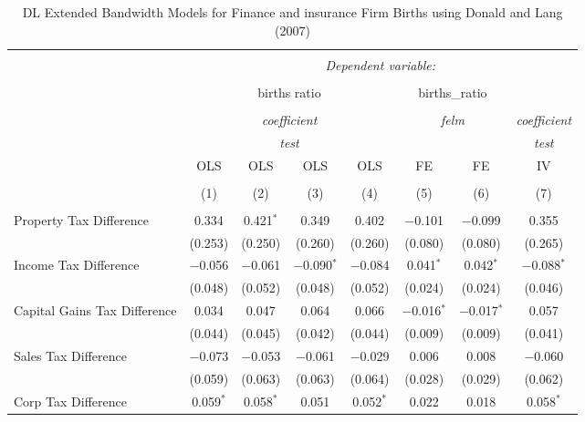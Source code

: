 
\begin{table}[!htbp] \centering 
  \caption{DL Extended Bandwidth Models for  Finance and insurance Firm Births using Donald and Lang (2007)} 
  \label{} 
\begin{tabular}{@{\extracolsep{5pt}}lccccccc} 
\\[-1.8ex]\hline 
\hline \\[-1.8ex] 
 & \multicolumn{7}{c}{\textit{Dependent variable:}} \\ 
\cline{2-8} 
\\[-1.8ex] & \multicolumn{4}{c}{births ratio} & \multicolumn{2}{c}{births\_ratio} &   \\ 
\\[-1.8ex] & \multicolumn{4}{c}{\textit{coefficient}} & \multicolumn{2}{c}{\textit{felm}} & \textit{coefficient} \\ 
 & \multicolumn{4}{c}{\textit{test}} & \multicolumn{2}{c}{\textit{}} & \textit{test} \\ 
 & OLS & OLS & OLS & OLS & FE & FE & IV \\ 
\\[-1.8ex] & (1) & (2) & (3) & (4) & (5) & (6) & (7)\\ 
\hline \\[-1.8ex] 
 Property Tax Difference & 0.334 & 0.421$^{*}$ & 0.349 & 0.402 & $-$0.101 & $-$0.099 & 0.355 \\ 
  & (0.253) & (0.250) & (0.260) & (0.260) & (0.080) & (0.080) & (0.265) \\ 
  Income Tax Difference & $-$0.056 & $-$0.061 & $-$0.090$^{*}$ & $-$0.084 & 0.041$^{*}$ & 0.042$^{*}$ & $-$0.088$^{*}$ \\ 
  & (0.048) & (0.052) & (0.048) & (0.052) & (0.024) & (0.024) & (0.046) \\ 
  Capital Gains Tax Difference & 0.034 & 0.047 & 0.064 & 0.066 & $-$0.016$^{*}$ & $-$0.017$^{*}$ & 0.057 \\ 
  & (0.044) & (0.045) & (0.042) & (0.044) & (0.009) & (0.009) & (0.041) \\ 
  Sales Tax Difference & $-$0.073 & $-$0.053 & $-$0.061 & $-$0.029 & 0.006 & 0.008 & $-$0.060 \\ 
  & (0.059) & (0.063) & (0.063) & (0.064) & (0.028) & (0.029) & (0.062) \\ 
  Corp Tax Difference & 0.059$^{*}$ & 0.058$^{*}$ & 0.051 & 0.052$^{*}$ & 0.022 & 0.018 & 0.058$^{*}$ \\ 

\end{tabular}
\end{table}
